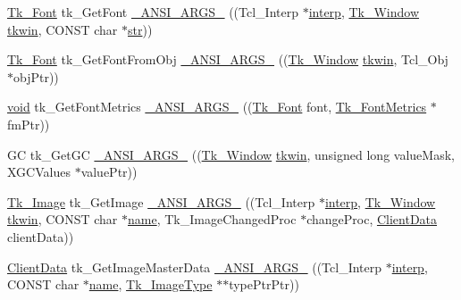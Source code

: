 \begin{DoxyCompactItemize}
\item 
\hyperlink{tk_8h_a9fc14938fbad69507d71d60fe79e26f6}{Tk\+\_\+\+Font} tk\+\_\+\+Get\+Font \hyperlink{struct_tk_stubs_af94cc60cb23d1c71f7b401652fb2f7db}{\+\_\+\+A\+N\+S\+I\+\_\+\+A\+R\+G\+S\+\_\+} ((Tcl\+\_\+\+Interp $\ast$\hyperlink{tk_8h_a5ab79c0f5849ee8e6a2e955a6c536cc0}{interp}, \hyperlink{tk_8h_ab756137de3ee74edc2501bd0d761e37c}{Tk\+\_\+\+Window} \hyperlink{tk_8h_a35df722e7e1b6efd651683b8be7c1490}{tkwin}, C\+O\+N\+ST char $\ast$\hyperlink{morph_8c_ab50d783982593ef993ea0b68f7ad8b80}{str}))
\item 
\hyperlink{tk_8h_a9fc14938fbad69507d71d60fe79e26f6}{Tk\+\_\+\+Font} tk\+\_\+\+Get\+Font\+From\+Obj \hyperlink{struct_tk_stubs_ab71faadbf0b4b7738280627fe767b37a}{\+\_\+\+A\+N\+S\+I\+\_\+\+A\+R\+G\+S\+\_\+} ((\hyperlink{tk_8h_ab756137de3ee74edc2501bd0d761e37c}{Tk\+\_\+\+Window} \hyperlink{tk_8h_a35df722e7e1b6efd651683b8be7c1490}{tkwin}, Tcl\+\_\+\+Obj $\ast$obj\+Ptr))
\item 
\hyperlink{tk_8h_aba408b7cd755a96426e004c015f5de8e}{void} tk\+\_\+\+Get\+Font\+Metrics \hyperlink{struct_tk_stubs_afbccf6130233a4fabb79487b8fd5e579}{\+\_\+\+A\+N\+S\+I\+\_\+\+A\+R\+G\+S\+\_\+} ((\hyperlink{tk_8h_a9fc14938fbad69507d71d60fe79e26f6}{Tk\+\_\+\+Font} font, \hyperlink{struct_tk___font_metrics}{Tk\+\_\+\+Font\+Metrics} $\ast$fm\+Ptr))
\item 
GC tk\+\_\+\+Get\+GC \hyperlink{struct_tk_stubs_acfc329c845ed272a35340d6a242ee66c}{\+\_\+\+A\+N\+S\+I\+\_\+\+A\+R\+G\+S\+\_\+} ((\hyperlink{tk_8h_ab756137de3ee74edc2501bd0d761e37c}{Tk\+\_\+\+Window} \hyperlink{tk_8h_a35df722e7e1b6efd651683b8be7c1490}{tkwin}, unsigned long value\+Mask, X\+G\+C\+Values $\ast$value\+Ptr))
\item 
\hyperlink{tk_8h_af60ba3faf35d89dcf5c785d1a055e3e6}{Tk\+\_\+\+Image} tk\+\_\+\+Get\+Image \hyperlink{struct_tk_stubs_a0046d017c85eaa7deb0e5835b22e0ec8}{\+\_\+\+A\+N\+S\+I\+\_\+\+A\+R\+G\+S\+\_\+} ((Tcl\+\_\+\+Interp $\ast$\hyperlink{tk_8h_a5ab79c0f5849ee8e6a2e955a6c536cc0}{interp}, \hyperlink{tk_8h_ab756137de3ee74edc2501bd0d761e37c}{Tk\+\_\+\+Window} \hyperlink{tk_8h_a35df722e7e1b6efd651683b8be7c1490}{tkwin}, C\+O\+N\+ST char $\ast$\hyperlink{tk_8h_a2946c588fc7fa2fa5b43ac54b7872725}{name}, Tk\+\_\+\+Image\+Changed\+Proc $\ast$change\+Proc, \hyperlink{tk_8h_accf84b4d725a8f41e04d6333768a6001}{Client\+Data} client\+Data))
\item 
\hyperlink{tk_8h_accf84b4d725a8f41e04d6333768a6001}{Client\+Data} tk\+\_\+\+Get\+Image\+Master\+Data \hyperlink{struct_tk_stubs_adfa6a3c68e09f5cc40d207533d09af9b}{\+\_\+\+A\+N\+S\+I\+\_\+\+A\+R\+G\+S\+\_\+} ((Tcl\+\_\+\+Interp $\ast$\hyperlink{tk_8h_a5ab79c0f5849ee8e6a2e955a6c536cc0}{interp}, C\+O\+N\+ST char $\ast$\hyperlink{tk_8h_a2946c588fc7fa2fa5b43ac54b7872725}{name}, \hyperlink{struct_tk___image_type}{Tk\+\_\+\+Image\+Type} $\ast$$\ast$type\+Ptr\+Ptr))
$$
\end{DoxyCompactItemize}
